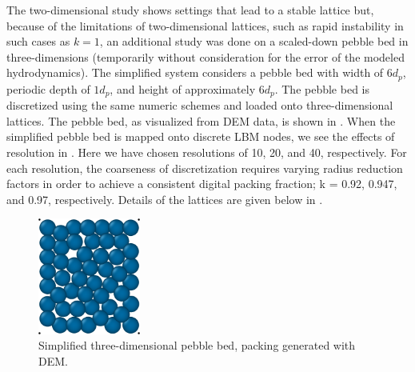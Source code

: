 The two-dimensional study shows settings that lead to a stable lattice but, because of the limitations of two-dimensional lattices, such as rapid instability in such cases as $k=1$, an additional study was done on a scaled-down pebble bed in three-dimensions (temporarily without consideration for the error of the modeled hydrodynamics). The simplified system considers a pebble bed with width of $6d_p$, periodic depth of $1d_p$, and height of approximately $6d_p$. The pebble bed is discretized using the same numeric schemes and loaded onto three-dimensional lattices. The pebble bed, as visualized from DEM data, is shown in . When the simplified pebble bed is mapped onto discrete LBM nodes, we see the effects of resolution in . Here we have chosen resolutions of 10, 20, and 40, respectively. For each resolution, the coarseness of discretization requires varying radius reduction factors in order to achieve a consistent digital packing fraction; k = 0.92, 0.947, and 0.97, respectively. Details of the lattices are given below in .

\begin{figure}[ht]
    \centering
    \includegraphics[width=0.3\textwidth]{figures/lbm/3d-bed}
    \caption{Simplified three-dimensional pebble bed, packing generated with DEM.}\label{fig:3d-bed-lbm}
\end{figure}


